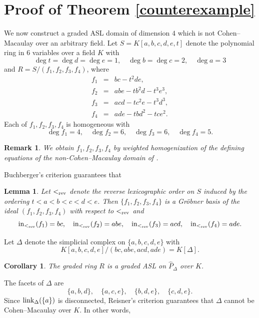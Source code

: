 \documentclass[12pt]{amsart}
\newtheorem{Lemma}[Theorem]{Lemma}
\newtheorem{Corollary}[Theorem]{Corollary}
\newtheorem{Remark}[Theorem]{Remark}
\begin{document}
\section{Proof of Theorem \ref{counterexample}}
We now construct a graded ASL domain of dimension $4$ which is not Cohen--Macaulay over an arbitrary field.  Let $S=K[a,b,c,d,e,t]$ denote the polynomial ring in $6$ variables over a field $K$ with
\[
\deg t = \deg d = \deg e = 1, \quad \deg b = \deg c = 2, \quad \deg a = 3
\]
and $R=S/(f_1,f_2,f_3,f_4)$, where 
\begin{eqnarray*}
f_1&=&bc-t^2de,\\
f_2&=&abe-tb^2d-t^3e^3,\\
f_3&=&acd-tc^2e-t^3d^3,\\
f_4&=&ade-tbd^2-tce^2.
\end{eqnarray*}
Each of $f_1,f_2,f_3,f_4$ is homogeneous with
\[
\deg f_1 = 4, \quad \deg f_2 = 6, \quad \deg f_3 = 6, \quad \deg f_4 = 5.
\]

\begin{Remark}
{\em
    We obtain $f_1,f_2,f_3,f_4$ by weighted homogenization of the defining equations of the non-Cohen--Macaulay domain of \cite[Example 3.14]{CV}.
    }
\end{Remark}
Buchberger's criterion \cite[Theorem 2.3.2]{HHgtm260} guarantees that 
\begin{Lemma}
    \label{initial}
    Let $<_{\rm rev}$ denote the reverse lexicographic order on $S$ induced by the ordering $t < a < b < c < d < e$.  Then $\{f_1,f_2,f_3,f_4\}$ is a Gr\"obner basis of the ideal $(f_1,f_2,f_3,f_4)$ with respect to $<_{\rm rev}$ and
    \[
{\rm in}_{<_{\rm rev}}(f_1)=bc, \quad {\rm in}_{<_{\rm rev}}(f_2)=abe, \quad {\rm in}_{<_{\rm rev}}(f_3)=acd, \quad {\rm in}_{<_{\rm rev}}(f_4)=ade.
    \]
\end{Lemma}

Let $\Delta$ denote the simplicial complex on $\{a,b,c,d,e\}$ with
\[
K[a,b,c,d,e]/(bc,abe,acd,ade) = K[\Delta].
\]

\begin{Corollary}
\label{ASL}
The graded ring $R$ is a graded ASL on ${\hat P}_\Delta$ over $K$. 
\end{Corollary}

The facets of $\Delta$ are 
\[
\{a,b,d\}, \quad \{a,c,e\}, \quad \{b,d,e\}, \quad \{c,d,e\}.
\]
Since ${\rm link}_\Delta(\{a\})$ is disconnected, Reisner's criterion \cite[Theorem (22.3)]{HIBIred} guarantees that $\Delta$ cannot be Cohen--Macaulay over $K$.  In other words, 
\end{document}
